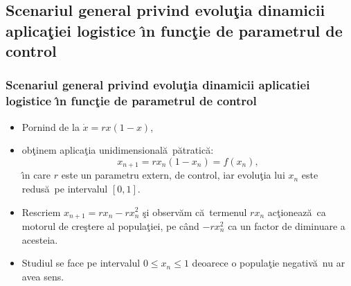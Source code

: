 \documentclass[a4,compress,handout]{beamer}
\newcommand{\ab}{\u{a}}
\newcommand{\ac}{\^{a}}
\newcommand{\ib}{\^{\i}}
\newcommand{\tb}{\c{t}}
\newcommand{\st}{\c{s}}
\begin{document}


\subsection[Evolu\tb ie]{Scenariul general privind evolu\tb ia dinamicii  aplica\tb iei logistice \ib n func\tb ie de parametrul de control}
\begin{frame}
	\frametitle{Scenariul general privind evolu\tb ia dinamicii  aplicatiei logistice \ib n func\tb ie de parametrul de control}
	\begin{itemize}
		\item \small Pornind de la $
		\dot{x}=rx\left(1-x \right)$,
		\item \small ob\tb inem aplica\tb ia  unidimensional\ab\ p\ab tratic\ab:
		\begin{equation*}
		x_{n+1}=r x_n  \left(1 - x_n \right)= f(x_n),
		\end{equation*}
		\ib n care $r$ este un parametru extern, de control, iar  evolu\tb ia lui $x_n$ este redus\ab\ pe intervalul $[0,1]$.
		\pause
		\item \small Rescriem  $x_{n+1}=r x_n  - r x_n^2$ \st i observ\ab m c\ab\ termenul {\color{red} $r x_n$} ac\tb ioneaz\ab\ ca {\color{red}motorul de cre\st tere} al popula\tb iei, pe c\ac nd {\color{blue}$-r x_n^2$} ca un {\color{blue}factor de diminuare} a acesteia. 
		\item \small Studiul se face pe intervalul $0 \le x_n \le 1$ deoarece o popula\tb ie negativ\ab\ nu ar avea sens.	
	\end{itemize}
	
\end{frame}


\end{document}
